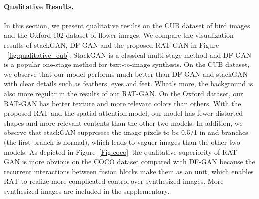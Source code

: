 \documentclass{article}
\begin{document}
	
	
	
	\paragraph {Qualitative Results.}
	In this section, we present qualitative results on the CUB dataset	of bird images and the Oxford-102 dataset of flower images. We compare the visualization results of stackGAN, DF-GAN and the proposed RAT-GAN in Figure ~\ref{fig:qualitative_cub}. StackGAN is a classical multi-stage method and DF-GAN is a popular one-stage method for text-to-image synthesis.
	On the CUB dataset, we observe that our model performs much better than DF-GAN and stackGAN with clear details such as feathers, eyes and feet. What's more, the background is also more regular in the results of our RAT-GAN. On the Oxford dataset, our RAT-GAN has better texture and more relevant colors than others.	 With the proposed RAT and the spatial attention model, our model has fewer distorted shapes and more relevant contents than the other two models. In addition, we observe that stackGAN suppresses the image pixels to be 0.5/1 in  and  branches (the first  branch is normal), which leads to vaguer images than the other two models.
    As depicted in Figure~\ref{Fig:coco}, the qualitative superiority of RAT-GAN is more obvious on the COCO dataset compared with DF-GAN because the recurrent interactions between fusion blocks make them as an unit, which enables RAT to realize more complicated control over synthesized images. More synthesized images are included in the supplementary.
 
\end{document}
